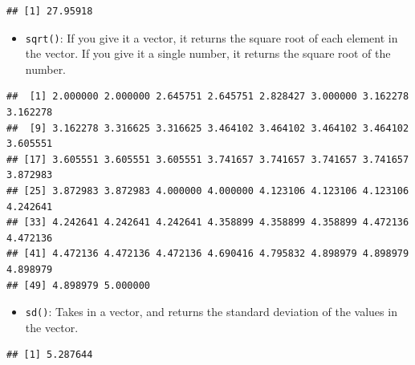 \documentclass[
]{book}
\newenvironment{Shaded}{\begin{snugshade}}{\end{snugshade}}
\newcommand{\KeywordTok}[1]{\textcolor[rgb]{0.13,0.29,0.53}{\textbf{#1}}}
\newcommand{\NormalTok}[1]{#1}
\newcommand{\OperatorTok}[1]{\textcolor[rgb]{0.81,0.36,0.00}{\textbf{#1}}}
\providecommand{\tightlist}{%
  \setlength{\itemsep}{0pt}\setlength{\parskip}{0pt}}
\begin{document}
\begin{Shaded}
\end{Shaded}

\begin{verbatim}
## [1] 27.95918
\end{verbatim}

\begin{itemize}
\tightlist
\item
  \texttt{sqrt()}: If you give it a vector, it returns the square root of each element in the vector. If you give it a single number, it returns the square root of the number.
\end{itemize}

\begin{Shaded}
\end{Shaded}

\begin{verbatim}
##  [1] 2.000000 2.000000 2.645751 2.645751 2.828427 3.000000 3.162278 3.162278
##  [9] 3.162278 3.316625 3.316625 3.464102 3.464102 3.464102 3.464102 3.605551
## [17] 3.605551 3.605551 3.605551 3.741657 3.741657 3.741657 3.741657 3.872983
## [25] 3.872983 3.872983 4.000000 4.000000 4.123106 4.123106 4.123106 4.242641
## [33] 4.242641 4.242641 4.242641 4.358899 4.358899 4.358899 4.472136 4.472136
## [41] 4.472136 4.472136 4.472136 4.690416 4.795832 4.898979 4.898979 4.898979
## [49] 4.898979 5.000000
\end{verbatim}

\begin{itemize}
\tightlist
\item
  \texttt{sd()}: Takes in a vector, and returns the standard deviation of the values in the vector.
\end{itemize}

\begin{Shaded}
\end{Shaded}

\begin{verbatim}
## [1] 5.287644
\end{verbatim}
\end{document}
